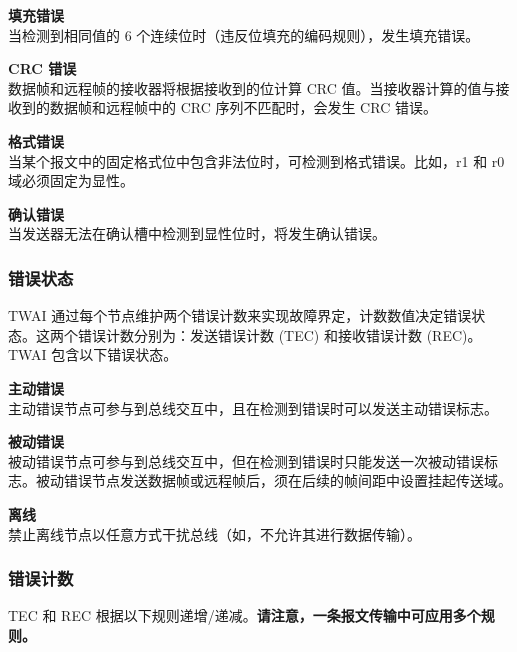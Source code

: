 \documentclass[main\_\_CN.tex]{subfiles}
\begin{document}
{\bfseries 填充错误}\\
当检测到相同值的 6 个连续位时（违反位填充的编码规则），发生填充错误。

{\bfseries CRC 错误}\\
数据帧和远程帧的接收器将根据接收到的位计算 CRC 值。当接收器计算的值与接收到的数据帧和远程帧中的 CRC 序列不匹配时，会发生 CRC 错误。

{\bfseries 格式错误}\\
当某个报文中的固定格式位中包含非法位时，可检测到格式错误。比如，r1 和 r0 域必须固定为显性。

{\bfseries 确认错误}\\
当发送器无法在确认槽中检测到显性位时，将发生确认错误。

\subsubsection{错误状态}
TWAI 通过每个节点维护两个错误计数来实现故障界定，计数数值决定错误状态。这两个错误计数分别为：发送错误计数 (TEC) 和接收错误计数 (REC)。TWAI 包含以下错误状态。

{\bfseries 主动错误}\\
主动错误节点可参与到总线交互中，且在检测到错误时可以发送主动错误标志。

{\bfseries 被动错误}\\
被动错误节点可参与到总线交互中，但在检测到错误时只能发送一次被动错误标志。被动错误节点发送数据帧或远程帧后，须在后续的帧间距中设置挂起传送域。

{\bfseries 离线}\\
禁止离线节点以任意方式干扰总线（如，不允许其进行数据传输）。

\subsubsection{错误计数}

TEC 和 REC 根据以下规则递增/递减。\textbf{请注意，一条报文传输中可应用多个规则。}
\end{document}
